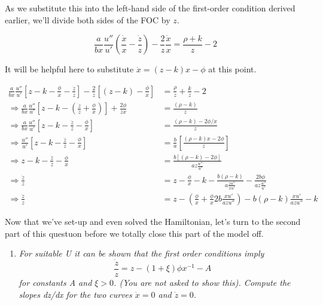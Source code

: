 \documentclass[
]{article}
\providecommand{\tightlist}{%
  \setlength{\itemsep}{0pt}\setlength{\parskip}{0pt}}
\begin{document}
As we substitute this into the left-hand side of the first-order
condition derived earlier, we'll divide both sides of the FOC by \(z\).

\[\frac{a}{bx}\frac{u''}{u'}\left(\frac{\dot{x}}{x} - \frac{\dot{z}}{z}\right) - \frac{2}{z}\frac{\dot{x}}{x} = \frac{\rho + k}{z} - 2\]

It will be helpful here to substitute \(\dot{x} = (z-k)x - \phi\) at
this point.

\begin{align}

\frac{a}{bx}\frac{u''}{u'}\left[z - k - \frac{\phi}{x} - \frac{\dot{z}}{z}\right] - \frac{2}{z}\left[(z-k) - \frac{\phi}{x}\right] &= \frac{\rho}{z} + \frac{k}{z} - 2 \\
\Rightarrow \frac{a}{bx}\frac{u''}{u'}\left[ z - k - \left( \frac{\dot{z}}{z} + \frac{\phi}{x}\right) \right] + \frac{2 \phi}{zx} &= \frac{(\rho - k)}{z} \\
\Rightarrow \frac{a}{bx}\frac{u''}{u'}\left[ z - k - \frac{\dot{z}}{z} - \frac{\phi}{x} \right] &= \frac{(\rho - k) - 2\phi/x}{z} \\
\Rightarrow \frac{u''}{u'}\left[ z - k - \frac{\dot{z}}{z} - \frac{\phi}{x} \right] &= \frac{b}{a}\left[\frac{(\rho - k)x - 2\phi}{z}\right] \\
\Rightarrow z - k - \frac{\dot{z}}{z} - \frac{\phi}{x} &= \frac{b[(\rho - k ) - 2\phi]}{az\frac{u''}{u'}} \\
\Rightarrow \frac{\dot{z}}{z} &= z - \frac{\phi}{x} - k - \frac{b(\rho - k)}{a\frac{zu''}{xu'}} - \frac{2b\phi}{az\frac{u''}{u'}} \\
\Rightarrow \frac{\dot{z}}{z} &= z - \left( \frac{\phi}{x} + \frac{\phi}{x}2b\frac{xu'}{azu''} \right)- b(\rho - k)\frac{xu'}{azu''} - k

\end{align}

Now that we've set-up and even solved the Hamiltonian, let's turn to the
second part of this questuon before we totally close this part of the
model off.

\begin{enumerate}
\def\labelenumi{\arabic{enumi}.}
\setcounter{enumi}{1}
\tightlist
\item
  \emph{For suitable U it can be shown that the first order conditions
  imply} \[\frac{\dot{z}}{z} = z - (1+\xi)\phi x^{-1} - A\] \emph{for
  constants A and \(\xi>0\). (You are not asked to show this). Compute
  the slopes dz/dx for the two curves \(\dot{x} = 0\) and
  \(\dot{z} = 0\).}
\end{enumerate}
\end{document}
